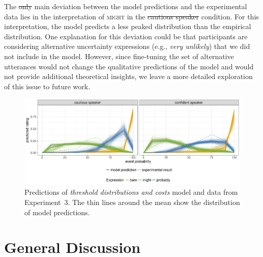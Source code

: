 \documentclass[man, floatsintext]{apa6}
\providecommand{\DIFadd}[1]{{\protect\color{blue}\uwave{#1}}} %
\providecommand{\DIFdel}[1]{{\protect\color{red}\sout{#1}}}                      %
\providecommand{\DIFaddbegin}{} %
\providecommand{\DIFaddend}{} %
\providecommand{\DIFdelbegin}{} %
\providecommand{\DIFdelend}{} %
\newcommand{\DIFscaledelfig}{0.5}
\newlength{\DIFdelgraphicswidth} %
\newlength{\DIFdelgraphicsheight} %
\newcommand{\DIFaddincludegraphics}[2][]{{\color{blue}\fbox{\DIFOincludegraphics[#1]{#2}}}} %
\newcommand{\DIFdelincludegraphics}[2][]{%
\sbox{\DIFdelgraphicsbox}{\DIFOincludegraphics[#1]{#2}}%
\settoboxwidth{\DIFdelgraphicswidth}{\DIFdelgraphicsbox} %
\settoboxtotalheight{\DIFdelgraphicsheight}{\DIFdelgraphicsbox} %
\scalebox{\DIFscaledelfig}{%
\parbox[b]{\DIFdelgraphicswidth}{\usebox{\DIFdelgraphicsbox}\\[-\baselineskip] \rule{\DIFdelgraphicswidth}{0em}}\llap{\resizebox{\DIFdelgraphicswidth}{\DIFdelgraphicsheight}{%
\setlength{\unitlength}{\DIFdelgraphicswidth}%
\begin{picture}(1,1)%
\thicklines\linethickness{2pt} %
{\color[rgb]{1,0,0}\put(0,0){\framebox(1,1){}}}%
{\color[rgb]{1,0,0}\put(0,0){\line( 1,1){1}}}%
{\color[rgb]{1,0,0}\put(0,1){\line(1,-1){1}}}%
\end{picture}%
}\hspace*{3pt}}} %
} %
\DeclareRobustCommand{\DIFaddbegin}{\DIFOaddbegin \let\includegraphics\DIFaddincludegraphics} %
\DeclareRobustCommand{\DIFaddend}{\DIFOaddend \let\includegraphics\DIFOincludegraphics} %
\DeclareRobustCommand{\DIFdelbegin}{\DIFOdelbegin \let\includegraphics\DIFdelincludegraphics} %
\DeclareRobustCommand{\DIFdelend}{\DIFOaddend \let\includegraphics\DIFOincludegraphics} %
\begin{document}
The \DIFdelbegin \DIFdel{only }\DIFdelend main deviation between the model predictions and the experimental data lies in the interpretation of \textsc{might} in the \DIFdelbegin \DIFdel{cautious speaker }\DIFdelend \DIFaddbegin \textit{\DIFadd{cautious speaker}} \DIFaddend condition. For this interpretation, the model predicts a less peaked distribution than the empirical distribution.  One explanation for this deviation could be that participants are considering alternative uncertainty expressions (e.g., \textit{very unlikely}) that we did not include in the model.  However, since fine-tuning the set of alternative utterances would not change the qualitative predictions of the model and would not provide additional theoretical insights, we leave a more detailed exploration of this issue to future work. 

\begin{figure}
\includegraphics[width=\textwidth]{plots/adaptation-posterior-comp-data.pdf}
\caption{Predictions of \textit{threshold distributions and costs} model and data from Experiment~3. The thin lines around the mean show the distribution of model predictions.  \label{fig:post-exposure-comp-data}}
\end{figure}

\section{General Discussion}
\end{document}
